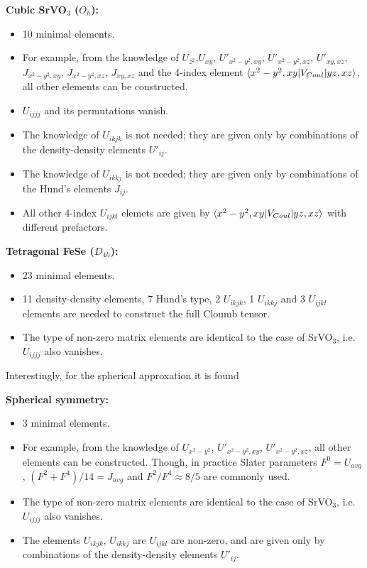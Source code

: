 \documentclass[12pt,a4paper]{scrartcl}
\numberwithin{equation}{section}
\begin{document}
\textbf{Cubic SrVO$_3$ ($O_h$):}
\begin{itemize}
 \item 10 minimal elements. 
 \item For example, from the knowledge of $U_{z^2}$,$U_{xy}$, $U'_{x^2-y^2,xy}$,  $U'_{x^2-y^2,xz}$, $U'_{xy,xz}$, $J_{x^2-y^2,xy}$,
 $J_{x^2-y^2,xz}$, $J_{xy,xz}$ and the 4-index element $\braket{x^2-y^2, xy | V_{Coul}| yz,xz}$, all other elements can be constructed. 
 \item $U_{ijjj}$ and its permutations vanish.
 \item The knowledge of $U_{ikjk}$ is not needed; they are given only by combinations of the density-density elements $U'_{ij}$.
 \item The knowledge of $U_{ikkj}$ is not needed; they are given only by combinations of the Hund's elements $J_{ij}$.
 \item All other 4-index $U_{ijkl}$ elemets are given by $\braket{x^2-y^2, xy | V_{Coul}| yz,xz}$ with different prefactors.
\end{itemize}

\textbf{Tetragonal FeSe ($D_{4h}$):}
\begin{itemize}
 \item 23 minimal elements. 
 \item 11 density-density elements, 7 Hund's type, 2 $U_{ikjk}$, 1 $U_{ikkj}$ and 3 $U_{ijkl}$ elements are needed
 to construct the full Cloumb tensor.
 \item The type of non-zero matrix elements are identical to the case of SrVO$_3$, i.e. $U_{ijjj}$ also vanishes.
\end{itemize}
 
Interestingly, for the spherical approxation it is found

\bigskip

\textbf{Spherical symmetry:}
\begin{itemize}
 \item 3 minimal elements. 
 \item For example, from the knowledge of $U_{x^2-y^2}$, $U'_{x^2-y^2,xy}$,  $U'_{x^2-y^2,xz}$, all other elements can be constructed. Though, in practice Slater parameters $F^0=U_{avg}$, $(F^2+F^4)/14=J_{avg}$ and $F^2/F^4\approx 8/5$ are commonly used.
 \item The type of non-zero matrix elements are identical to the case of SrVO$_3$, i.e. $U_{ijjj}$ also vanishes.
 \item The elements  $U_{ikjk}$, $U_{ikkj}$ are $U_{ijkl}$ are non-zero, and are given only by combinations of the density-density elements $U'_{ij}$.
\end{itemize}
 
\end{document}
